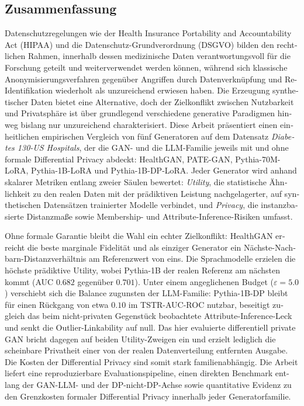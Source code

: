 

\begin{otherlanguage}{ngerman}
    \section*{Zusammenfassung}

    Datenschutzregelungen wie der Health Insurance Portability and
    Accountability Act (HIPAA) und die Datenschutz-Grundverordnung (DSGVO)
    bilden den rechtlichen Rahmen, innerhalb dessen medizinische Daten
    verantwortungsvoll f\"ur die Forschung geteilt und weiterverwendet werden
    k\"onnen, w\"ahrend sich klassische Anonymisierungsverfahren gegen\"uber
    Angriffen durch Datenverkn\"upfung und Re-Identifikation wiederholt als
    unzureichend erwiesen haben.
    Die Erzeugung synthetischer Daten bietet eine Alternative, doch der
    Zielkonflikt zwischen Nutzbarkeit und Privatsph\"are ist \"uber
    grundlegend verschiedene generative Paradigmen hinweg bislang nur
    unzureichend charakterisiert. Diese Arbeit pr\"asentiert einen
    einheitlichen empirischen Vergleich von f\"unf Generatoren auf dem
    Datensatz \emph{Diabetes 130-US Hospitals}, der die GAN- und die
    LLM-Familie jeweils mit und ohne formale Differential Privacy abdeckt:
    HealthGAN, PATE-GAN, Pythia-70M-LoRA, Pythia-1B-LoRA und
    Pythia-1B-DP-LoRA. Jeder Generator wird anhand skalarer Metriken entlang
    zweier S\"aulen bewertet: \emph{Utility}, die statistische \"Ahnlichkeit
    zu den realen Daten mit der pr\"adiktiven Leistung nachgelagerter, auf
    synthetischen Datens\"atzen trainierter Modelle verbindet, und
    \emph{Privacy}, die instanzbasierte Distanzma{\ss}e sowie Membership- und
    Attribute-Inference-Risiken umfasst.

    Ohne formale Garantie bleibt die Wahl ein echter Zielkonflikt: HealthGAN
    erreicht die beste marginale Fidelit\"at und als einziger Generator ein
    N\"achste-Nachbarn-Distanzverh\"altnis am Referenzwert von eins. Die
    Sprachmodelle erzielen die h\"ochste pr\"adiktive Utility, wobei
    Pythia-1B der realen Referenz am n\"achsten kommt (AUC $0.682$
    gegen\"uber $0.701$). Unter einem angeglichenen Budget
    ($\varepsilon = 5.0$) verschiebt sich die Balance zugunsten der
    LLM-Familie: Pythia-1B-DP bleibt f\"ur einen R\"uckgang von etwa $0.10$
    im TSTR-AUC-ROC nutzbar, beseitigt zugleich das beim nicht-privaten
    Gegenst\"uck beobachtete Attribute-Inference-Leck und senkt die
    Outlier-Linkability auf null. Das hier evaluierte differentiell private
    GAN bricht dagegen auf beiden Utility-Zweigen ein und erzielt lediglich
    die scheinbare Privatheit einer von der realen Datenverteilung
    entfernten Ausgabe. Die Kosten der Differential Privacy sind somit stark
    familienabh\"angig. Die Arbeit liefert eine reproduzierbare
    Evaluationspipeline, einen direkten Benchmark entlang der GAN-LLM- und
    der DP-nicht-DP-Achse sowie quantitative Evidenz zu den Grenzkosten
    formaler Differential Privacy innerhalb jeder Generatorfamilie.
\end{otherlanguage}
\cleardoublepage


